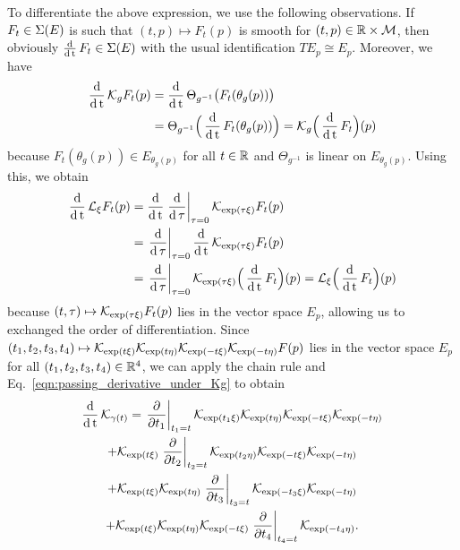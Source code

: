 \documentclass[twoside,11pt]{article}
\begin{document}
    To differentiate the above expression, we use the following observations.
    If $F_t \in \operatorname{\Sigma}(E)$ is such that $(t,p) \mapsto F_t(p)$ is smooth for $(t,p)\in\mathbb{R}\times{\mathcal{M}}$, then obviously $\operatorname{\frac{\operatorname{\mathrm{d}}}{\operatorname{\mathrm{d}} t}} F_t\in\operatorname{\Sigma}(E)$ with the usual identification $T E_p \cong E_p$.
    Moreover, we have
    \begin{equation}
    \begin{aligned}
        \operatorname{\frac{\operatorname{\mathrm{d}}}{\operatorname{\mathrm{d}} t}} {\mathcal{K}}_g F_t(p) 
        &= \operatorname{\frac{\operatorname{\mathrm{d}}}{\operatorname{\mathrm{d}} t}} \Theta_{g^{-1}}\big( F_t(\theta_g(p)) \big) \\
        &= \Theta_{g^{-1}}\Big( \operatorname{\frac{\operatorname{\mathrm{d}}}{\operatorname{\mathrm{d}} t}} F_t(\theta_g(p)) \Big)
        = {\mathcal{K}}_g \Big( \operatorname{\frac{\operatorname{\mathrm{d}}}{\operatorname{\mathrm{d}} t}} F_t \Big)(p)
        \label{eqn:passing_derivative_under_Kg}
    \end{aligned}
    \end{equation}
    because $F_t(\theta_g(p)) \in E_{\theta_g(p)}$ for all $t\in\mathbb{R}$ and $\Theta_{g^{-1}}$ is linear on $E_{\theta_g(p)}$.
    Using this, we obtain
    \begin{equation}
    \begin{aligned}
        \operatorname{\frac{\operatorname{\mathrm{d}}}{\operatorname{\mathrm{d}} t}} {\mathcal{L}}_{\xi} F_t(p) 
        &= \operatorname{\frac{\operatorname{\mathrm{d}}}{\operatorname{\mathrm{d}} t}} \left.\frac{\operatorname{\mathrm{d}}}{\operatorname{\mathrm{d}} \tau}\right\vert_{\tau=0} {\mathcal{K}}_{\exp(\tau\xi)} F_t(p) \\
        &= \left.\frac{\operatorname{\mathrm{d}}}{\operatorname{\mathrm{d}} \tau}\right\vert_{\tau=0} \operatorname{\frac{\operatorname{\mathrm{d}}}{\operatorname{\mathrm{d}} t}} {\mathcal{K}}_{\exp(\tau\xi)} F_t(p) \\
        &= \left.\frac{\operatorname{\mathrm{d}}}{\operatorname{\mathrm{d}} \tau}\right\vert_{\tau=0} {\mathcal{K}}_{\exp(\tau\xi)} \Big( \operatorname{\frac{\operatorname{\mathrm{d}}}{\operatorname{\mathrm{d}} t}} F_t \Big)(p)
        = {\mathcal{L}}_{\xi} \Big( \operatorname{\frac{\operatorname{\mathrm{d}}}{\operatorname{\mathrm{d}} t}} F_t \Big)(p)
        \label{eqn:passing_derivative_under_Lxi}
    \end{aligned}
    \end{equation}
    because $(t,\tau) \mapsto {\mathcal{K}}_{\exp(\tau\xi)} F_t(p)$ lies in the vector space $E_{p}$, allowing us to exchanged the order of differentiation.
    Since $(t_1, t_2, t_3, t_4) \mapsto {\mathcal{K}}_{\exp(t\xi)}{\mathcal{K}}_{\exp(t\eta)}{\mathcal{K}}_{\exp(-t\xi)}{\mathcal{K}}_{\exp(-t\eta)} F(p)$ lies in the vector space $E_p$ for all $(t_1, t_2, t_3, t_4)\in\mathbb{R}^4$, we can apply the chain rule and Eq.~\ref{eqn:passing_derivative_under_Kg} to obtain
    \begin{multline}
        \operatorname{\frac{\operatorname{\mathrm{d}}}{\operatorname{\mathrm{d}} t}} {\mathcal{K}}_{\gamma(t)}
        = \left.\frac{\partial}{\partial t_1}\right\vert_{t_1=t} {\mathcal{K}}_{\exp(t_1\xi)}{\mathcal{K}}_{\exp(t\eta)}{\mathcal{K}}_{\exp(-t\xi)}{\mathcal{K}}_{\exp(-t\eta)} \\
        + {\mathcal{K}}_{\exp(t\xi)} \left.\frac{\partial}{\partial t_2}\right\vert_{t_2=t} {\mathcal{K}}_{\exp(t_2\eta)}{\mathcal{K}}_{\exp(-t\xi)}{\mathcal{K}}_{\exp(-t\eta)} \\
        + {\mathcal{K}}_{\exp(t\xi)}{\mathcal{K}}_{\exp(t\eta)}\left.\frac{\partial}{\partial t_3}\right\vert_{t_3=t}{\mathcal{K}}_{\exp(-t_3\xi)}{\mathcal{K}}_{\exp(-t\eta)} \\
        + {\mathcal{K}}_{\exp(t\xi)}{\mathcal{K}}_{\exp(t\eta)}{\mathcal{K}}_{\exp(-t\xi)}\left.\frac{\partial}{\partial t_4}\right\vert_{t_4=t}{\mathcal{K}}_{\exp(-t_4\eta)}.
    \end{multline}
\end{document}
